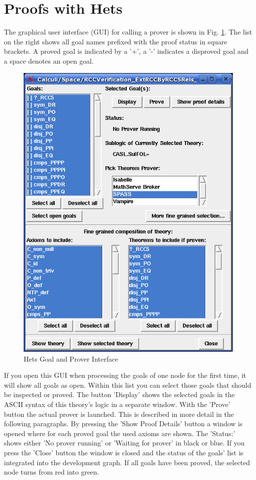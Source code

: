 \documentclass{article}
\begin{document}
\section{Proofs with Hets}\label{sec:Proofs}


The graphical user interface (GUI) for calling a prover
is shown in Fig. \ref{fig:proof_window}. The list on the right
shows all goal names prefixed with the proof status in square
brackets. A proved goal is indicated by a '+', a '-' indicates a
disproved goal and a space denotes an open goal.

\begin{figure}
\centering
\includegraphics[width=\textwidth]{proofmanagement1}
\caption{Hets Goal and Prover Interface\label{fig:proof_window}}
\end{figure}

If you open this GUI when processing the goals of one node for the first
time, it will show all goals as open. Within this list you can select
those goals that should be inspected or proved. The button 'Display'
shows the selected goals in the ASCII syntax of this theory's logic in
a separate window. With the 'Prove' button the actual prover is
launched. This is described in more detail in the following
paragraphs. By pressing the 'Show Proof Details' button a window is
opened where for each proved goal the used axioms are shown. The
'Status:' shows either 'No prover running' or 'Waiting for prover' in
black or blue. If you press the 'Close' button the window is closed
and the status of the goals' list is integrated into the
development graph. If all goals have been proved, the selected node
turns from red into green.
\end{document}
